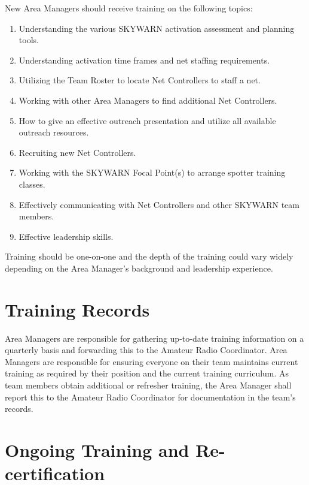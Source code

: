 \documentclass[pdflatex,letterpaper,twoside,12pt]{book}
\begin{document}
New Area Managers should receive training on the following topics:

\begin{enumerate}
\item Understanding the various SKYWARN activation assessment and planning tools.
\item Understanding activation time frames and net staffing requirements.
\item Utilizing the Team Roster to locate Net Controllers to staff a net.
\item Working with other Area Managers to find additional Net Controllers.
\item How to give an effective outreach presentation and utilize all available outreach resources.
\item Recruiting new Net Controllers.
\item Working with the SKYWARN Focal Point(s) to arrange spotter training classes.
\item Effectively communicating with Net Controllers and other SKYWARN team members.
\item Effective leadership skills.
\end{enumerate}

Training should be one-on-one and the depth of the training could vary widely depending on the Area Manager's background and leadership experience.


\section{Training Records}

Area Managers are responsible for gathering up-to-date training information on a quarterly basis and forwarding this to the Amateur Radio Coordinator.  Area Managers are responsible for ensuring everyone on their team maintains current training as required by their position and the current training curriculum. As team members obtain additional or refresher training, the Area Manager shall report this to the Amateur Radio Coordinator for documentation in the team's records.


\section{Ongoing Training and Re-certification}
\end{document}
